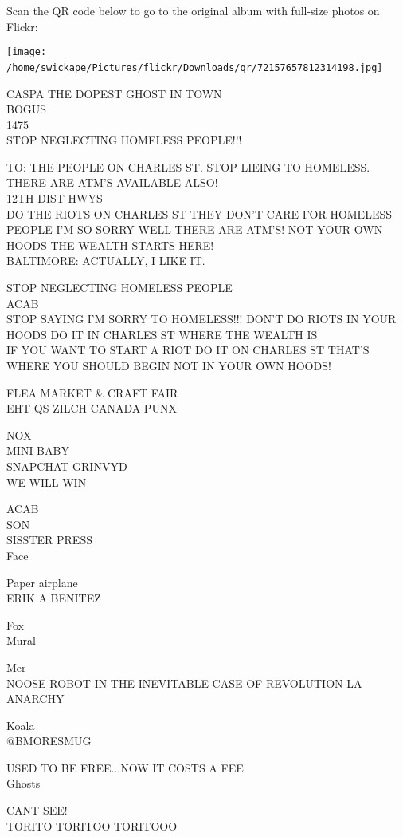 \documentclass[10pt,letterpaper]{article}
\begin{document}
Scan the QR code below to go to the original album with full-size photos on Flickr:

\texttt{[image: /home/swickape/Pictures/flickr/Downloads/qr/72157657812314198.jpg]}
\

CASPA THE DOPEST GHOST IN TOWN\\
BOGUS\\
1475\\
STOP NEGLECTING HOMELESS PEOPLE!!!

TO: THE PEOPLE ON CHARLES ST. STOP LIEING TO HOMELESS.  THERE ARE ATM'S AVAILABLE ALSO!\\
12TH DIST HWYS\\
DO THE RIOTS ON CHARLES ST THEY DON'T CARE FOR HOMELESS PEOPLE I'M SO SORRY WELL THERE ARE ATM'S!  NOT YOUR OWN HOODS THE WEALTH STARTS HERE!\\
BALTIMORE: ACTUALLY, I LIKE IT.

STOP NEGLECTING HOMELESS PEOPLE\\
ACAB\\
STOP SAYING I'M SORRY TO HOMELESS!!!  DON'T DO RIOTS IN YOUR HOODS DO IT IN CHARLES ST WHERE THE WEALTH IS\\
IF YOU WANT TO START A RIOT DO IT ON CHARLES ST THAT'S WHERE YOU SHOULD BEGIN NOT IN YOUR OWN HOODS!

FLEA MARKET \& CRAFT FAIR\\
EHT QS ZILCH CANADA PUNX

NOX\\
MINI BABY\\
SNAPCHAT GRINVYD\\
WE WILL WIN

ACAB\\
SON\\
SISSTER PRESS\\
Face

Paper airplane\\
ERIK A BENITEZ

Fox\\
Mural

Mer\\
NOOSE ROBOT IN THE INEVITABLE CASE OF REVOLUTION LA ANARCHY

Koala\\
@BMORESMUG

USED TO BE FREE...NOW IT COSTS A FEE\\
Ghosts

CANT SEE!\\
TORITO TORITOO TORITOOO
\end{document}
